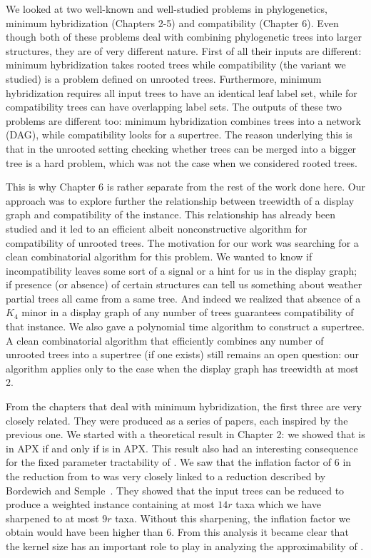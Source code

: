 



We looked at two well-known and well-studied problems in phylogenetics, minimum hybridization (Chapters 2-5) and compatibility (Chapter 6). Even though both of these problems deal with combining phylogenetic trees into larger structures, they are of very different nature. First of all their inputs are different: minimum hybridization takes rooted trees while compatibility (the variant we studied) is a problem defined on unrooted trees. Furthermore, minimum hybridization requires all input trees to have an identical leaf label set, while for compatibility trees can have overlapping label sets. The outputs of these two problems are different too: minimum hybridization combines trees into a network (DAG), while compatibility looks for a supertree. The reason underlying this is that in the unrooted setting checking whether trees can be merged into a bigger tree is a hard problem, which was not the case when we considered rooted trees. 

This is why Chapter 6 is rather separate from the rest of the work done here. Our approach was to explore further the relationship between treewidth of a display graph and compatibility of the instance. This relationship has already been studied and it led to an efficient albeit nonconstructive algorithm for compatibility of unrooted trees. The motivation for our work was searching for a clean combinatorial algorithm for this problem. We wanted to know if incompatibility leaves some sort of a signal or a hint for us in the display graph; if presence (or absence) of certain structures can tell us something about weather partial trees all came from a same tree. And indeed we realized that absence of a $K_4$ minor in a display graph of any number of trees guarantees compatibility of that instance. We also gave a polynomial time algorithm to construct a supertree. A clean combinatorial algorithm that efficiently combines any number of unrooted trees into a supertree (if one exists) still remains an open question: our algorithm applies only to the case when the display graph has treewidth at most 2.

From the chapters that deal with minimum hybridization, the first three are very closely related. They were produced as a series of papers, each inspired by the previous one. We started with a theoretical result in Chapter 2: we showed that \mh is in APX if and only if \dfvs is in APX. This result also had an interesting consequence for the fixed parameter tractability of \mh. We saw that the inflation factor of 6 in the reduction from \dfvs to \mh was very closely linked to a reduction described by Bordewich and Semple~\cite{bordewich07b}. They showed that the input trees can be reduced to produce a weighted instance containing at most $14r$ taxa which we have sharpened to at most $9r$ taxa. Without this sharpening, the inflation factor we obtain would have been higher than 6. From this analysis it became clear that the kernel size has an important role to play in analyzing the approximability of \mh.

